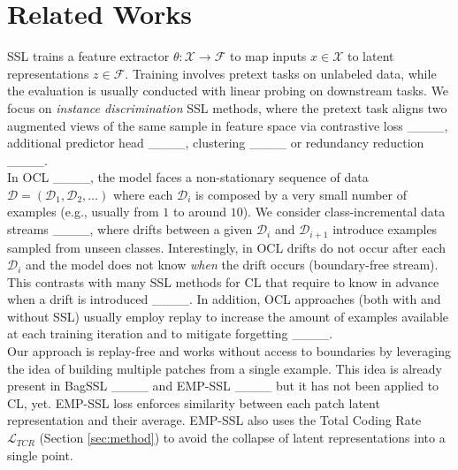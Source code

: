 \section{Related Works}
SSL trains a feature extractor $\theta: \mathcal{X} \rightarrow \mathcal{F}$ to map inputs \(x \in \mathcal{X}\) to latent representations \(z \in \mathcal{F}\). Training involves pretext tasks on unlabeled data, while the evaluation is usually conducted with linear probing on downstream tasks.
We focus on \textit{instance discrimination} SSL methods, where the pretext task aligns two augmented views of the same sample in feature space via contrastive loss ____, additional predictor head ____, clustering ____ or redundancy reduction ____.\\
In OCL ____, the model faces a non-stationary sequence of data $\mathcal{D} = (\mathcal{D}_1, \mathcal{D}_2, \ldots)$ where each $\mathcal{D}_i$ is composed by a very small number of examples (e.g., usually from $1$ to around $10$). We consider class-incremental data streams ____, where drifts between a given $\mathcal{D}_i$ and $\mathcal{D}_{i+1}$ introduce examples sampled from unseen classes. Interestingly, in OCL drifts do not occur after each $\mathcal{D}_i$ and the model does not know \emph{when} the drift occurs (boundary-free stream). This contrasts with many SSL methods for CL that require to know in advance when a drift is introduced ____. In addition, OCL approaches (both with and without SSL) usually employ replay to increase the amount of examples available at each training iteration and to mitigate forgetting ____.\\
Our approach is replay-free and works without access to boundaries by leveraging the idea of building multiple patches from a single example. This idea is already present in BagSSL ____ and EMP-SSL ____ but it has not been applied to CL, yet.
EMP-SSL loss enforces similarity between each patch latent representation and their average. EMP-SSL also uses the Total Coding Rate $\mathcal{L}_\textit{TCR}$ (Section \ref{sec:method}) to avoid the collapse of latent representations into a single point.


